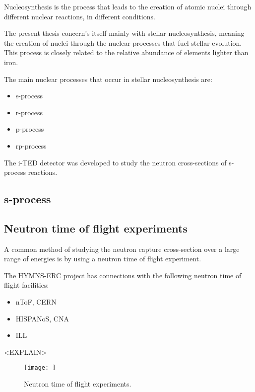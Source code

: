 Nucleosynthesis is the process that leads to the creation of atomic nuclei through different nuclear reactions, in different conditions.

The present thesis concern's itself mainly with stellar nucleosynthesis, meaning the creation of nuclei through the nuclear processes that fuel stellar evolution. This process is closely related to the relative abundance of elements lighter than iron.

The main nuclear processes that occur in stellar nucleosynthesis are:
\begin{itemize}
    \item s-process
    \item r-process
    \item p-process
    \item rp-process
\end{itemize}

The \ac{i-TED} detector was developed to study the neutron cross-sections of s-process reactions.

\subsection{s-process}


\subsection{Neutron time of flight experiments}

A common method of studying the neutron capture cross-section over a large range of energies is by using a neutron time of flight experiment.

The \ac{HYMNS}-\ac{ERC} project has connections with the following neutron time of flight facilities:
\begin{itemize}
    \item \ac{nToF}, \ac{CERN}
    \item \ac{HISPANoS}, \ac{CNA}
    \item \ac{ILL}
\end{itemize}

<EXPLAIN>

\begin{figure}[h!]
    \centering
    \texttt{[image: ]}%
    \caption{Neutron time of flight experiments.}%
    \label{fig:ntof}%
\end{figure}

